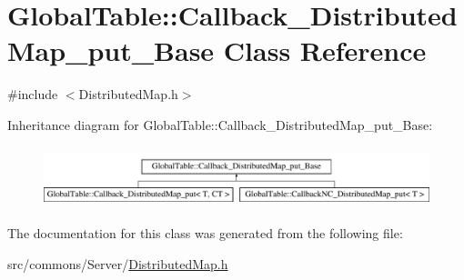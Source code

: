 \hypertarget{class_global_table_1_1_callback___distributed_map__put___base}{
\section{GlobalTable::Callback\_\-DistributedMap\_\-put\_\-Base Class Reference}
\label{class_global_table_1_1_callback___distributed_map__put___base}
}


{\ttfamily \#include $<$DistributedMap.h$>$}

Inheritance diagram for GlobalTable::Callback\_\-DistributedMap\_\-put\_\-Base:\begin{figure}[H]
\begin{center}
\leavevmode
\includegraphics[height=1.78344cm]{class_global_table_1_1_callback___distributed_map__put___base}
\end{center}
\end{figure}


The documentation for this class was generated from the following file:\begin{DoxyCompactItemize}
\item 
src/commons/Server/\hyperlink{_distributed_map_8h}{DistributedMap.h}\end{DoxyCompactItemize}
